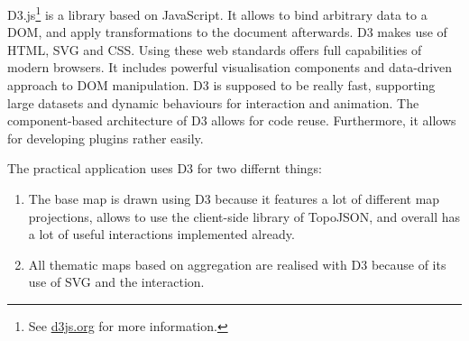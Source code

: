 D3.js\footnote{See \href{https://d3js.org/}{d3js.org} for more information.} is a library based on JavaScript. It allows to bind arbitrary data to a \ac{DOM}, and apply transformations to the document afterwards. \ac{D3} makes use of \ac{HTML}, \ac{SVG} and \ac{CSS}. Using these web standards offers full capabilities of modern browsers. It includes powerful visualisation components and data-driven approach to \ac{DOM} manipulation. \ac{D3} is supposed to be really fast, supporting large datasets and dynamic behaviours for interaction and animation. The component-based architecture of \ac{D3} allows for code reuse. Furthermore, it allows for developing plugins rather easily.

The practical application uses \ac{D3} for two differnt things:
\begin{enumerate}
\item The base map is drawn using \ac{D3} because it features a lot of different map projections, allows to use the client-side library of TopoJSON, and overall has a lot of useful interactions implemented already.
\item All thematic maps based on aggregation are realised with \ac{D3} because of its use of \ac{SVG} and the interaction.
\end{enumerate}